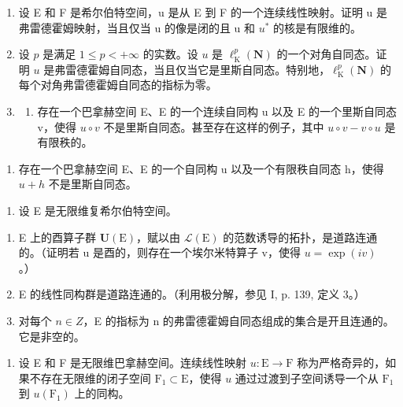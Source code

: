 \exercisesection{}

\begin{enumerate}
\def\labelenumi{\arabic{enumi})}
\item
  设 E 和 F 是希尔伯特空间，u 是从 E 到 F 的一个连续线性映射。证明 u 是弗雷德霍姆映射，当且仅当 u 的像是闭的且 u 和 \(u^{*}\) 的核是有限维的。
\item
  设 \(p\) 是满足 \(1 \leqslant p < +\infty\) 的实数。设 \(u\) 是 \(\ell_{\mathrm{K}}^{p}(\mathbf{N})\) 的一个对角自同态。证明 \(u\) 是弗雷德霍姆自同态，当且仅当它是里斯自同态。特别地，\(\ell_{\mathrm{K}}^{p}(\mathbf{N})\) 的每个对角弗雷德霍姆自同态的指标为零。
\item
  \begin{enumerate}
  \def\labelenumii{\alph{enumii})}
  \tightlist
  \item
    存在一个巴拿赫空间 E、E 的一个连续自同构 u 以及 E 的一个里斯自同态 v，使得 \(u \circ v\) 不是里斯自同态。甚至存在这样的例子，其中 \(u \circ v - v \circ u\) 是有限秩的。
  \end{enumerate}
\end{enumerate}

\begin{enumerate}
\def\labelenumi{\alph{enumi})}
\setcounter{enumi}{1}
\tightlist
\item
  存在一个巴拿赫空间 E、E 的一个自同构 u 以及一个有限秩自同态 h，使得 \(u + h\) 不是里斯自同态。
\end{enumerate}

\begin{enumerate}
\def\labelenumi{\arabic{enumi})}
\setcounter{enumi}{3}
\tightlist
\item
  设 E 是无限维复希尔伯特空间。
\end{enumerate}

\begin{enumerate}
\def\labelenumi{\alph{enumi})}
\item
  E 上的酉算子群 \(\mathbf{U}(\mathrm{E})\)，赋以由 \(\mathcal{L}(\mathrm{E})\) 的范数诱导的拓扑，是道路连通的。（证明若 u 是酉的，则存在一个埃尔米特算子 v，使得 \(u = \exp(iv)\) 。）
\item
  E 的线性同构群是道路连通的。（利用极分解，参见 I, p. 139, 定义 3。）
\item
  对每个 \(n \in Z\)，E 的指标为 n 的弗雷德霍姆自同态组成的集合是开且连通的。它是非空的。
\end{enumerate}

\begin{enumerate}
\def\labelenumi{\arabic{enumi})}
\setcounter{enumi}{4}
\tightlist
\item
  设 E 和 F 是无限维巴拿赫空间。连续线性映射 \(u: \mathrm{E} \to \mathrm{F}\) 称为严格奇异的，如果不存在无限维的闭子空间 \(\mathrm{F}_1 \subset \mathrm{E}\)，使得 \(u\) 通过过渡到子空间诱导一个从 \(\mathrm{F}_1\) 到 \(u(\mathrm{F}_1)\) 上的同构。
\end{enumerate}

